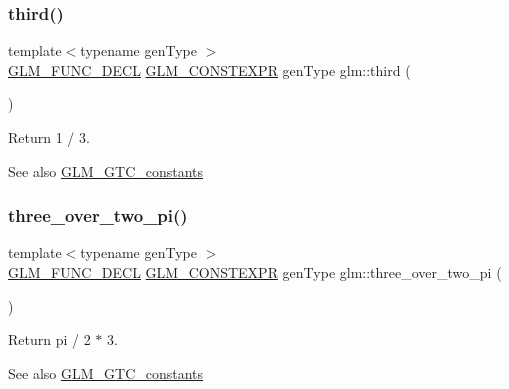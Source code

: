 \subsubsection{\texorpdfstring{third()}{third()}}
{\footnotesize\ttfamily template$<$typename gen\+Type $>$ \\
\mbox{\hyperlink{setup_8hpp_ab2d052de21a70539923e9bcbf6e83a51}{G\+L\+M\+\_\+\+F\+U\+N\+C\+\_\+\+D\+E\+CL}} \mbox{\hyperlink{setup_8hpp_a08b807947b47031d3a511f03f89645ad}{G\+L\+M\+\_\+\+C\+O\+N\+S\+T\+E\+X\+PR}} gen\+Type glm\+::third (\begin{DoxyParamCaption}{ }\end{DoxyParamCaption})}

Return 1 / 3. \begin{DoxySeeAlso}{See also}
\mbox{\hyperlink{group__gtc__constants}{G\+L\+M\+\_\+\+G\+T\+C\+\_\+constants}} 
\end{DoxySeeAlso}
\mbox{\label{group__gtc__constants_gae94950df74b0ce382b1fc1d978ef7394}} 
\subsubsection{\texorpdfstring{three\+\_\+over\+\_\+two\+\_\+pi()}{three\_over\_two\_pi()}}
{\footnotesize\ttfamily template$<$typename gen\+Type $>$ \\
\mbox{\hyperlink{setup_8hpp_ab2d052de21a70539923e9bcbf6e83a51}{G\+L\+M\+\_\+\+F\+U\+N\+C\+\_\+\+D\+E\+CL}} \mbox{\hyperlink{setup_8hpp_a08b807947b47031d3a511f03f89645ad}{G\+L\+M\+\_\+\+C\+O\+N\+S\+T\+E\+X\+PR}} gen\+Type glm\+::three\+\_\+over\+\_\+two\+\_\+pi (\begin{DoxyParamCaption}{ }\end{DoxyParamCaption})}

Return pi / 2 $\ast$ 3. \begin{DoxySeeAlso}{See also}
\mbox{\hyperlink{group__gtc__constants}{G\+L\+M\+\_\+\+G\+T\+C\+\_\+constants}} 
\end{DoxySeeAlso}
\mbox{\label{group__gtc__constants_ga74eadc8a211253079683219a3ea0462a}} 
